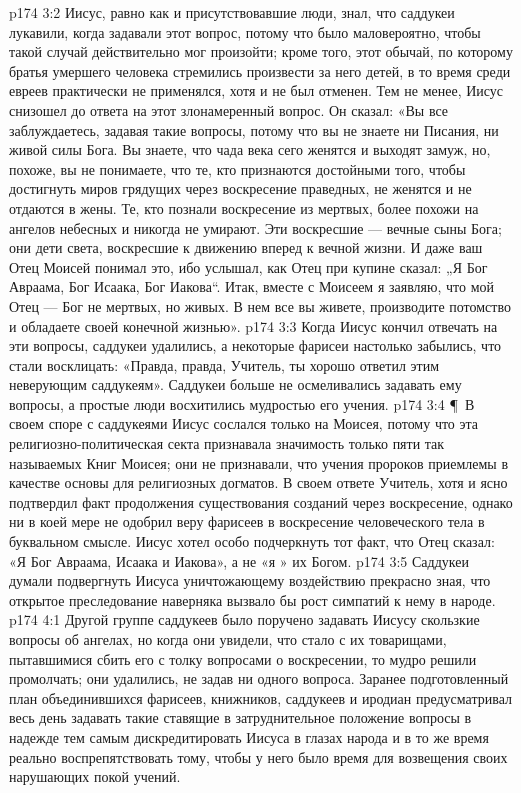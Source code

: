 \vs p174 3:2 Иисус, равно как и присутствовавшие люди, знал, что саддукеи лукавили, когда задавали этот вопрос, потому что было маловероятно, чтобы такой случай действительно мог произойти; кроме того, этот обычай, по которому братья умершего человека стремились произвести за него детей, в то время среди евреев практически не применялся, хотя и не был отменен. Тем не менее, Иисус снизошел до ответа на этот злонамеренный вопрос. Он сказал: «Вы все заблуждаетесь, задавая такие вопросы, потому что вы не знаете ни Писания, ни живой силы Бога. Вы знаете, что чада века сего женятся и выходят замуж, но, похоже, вы не понимаете, что те, кто признаются достойными того, чтобы достигнуть миров грядущих через воскресение праведных, не женятся и не отдаются в жены. Те, кто познали воскресение из мертвых, более похожи на ангелов небесных и никогда не умирают. Эти воскресшие --- вечные сыны Бога; они дети света, воскресшие к движению вперед к вечной жизни. И даже ваш Отец Моисей понимал это, ибо услышал, как Отец при купине сказал: „Я  Бог Авраама, Бог Исаака, Бог Иакова“. Итак, вместе с Моисеем я заявляю, что мой Отец --- Бог не мертвых, но живых. В нем все вы живете, производите потомство и обладаете своей конечной жизнью».
\vs p174 3:3 Когда Иисус кончил отвечать на эти вопросы, саддукеи удалились, а некоторые фарисеи настолько забылись, что стали восклицать: «Правда, правда, Учитель, ты хорошо ответил этим неверующим саддукеям». Саддукеи больше не осмеливались задавать ему вопросы, а простые люди восхитились мудростью его учения.
\vs p174 3:4 \P\ В своем споре с саддукеями Иисус сослался только на Моисея, потому что эта религиозно\hyp{}политическая секта признавала значимость только пяти так называемых Книг Моисея; они не признавали, что учения пророков приемлемы в качестве основы для религиозных догматов. В своем ответе Учитель, хотя и ясно подтвердил факт продолжения существования созданий через воскресение, однако ни в коей мере не одобрил веру фарисеев в воскресение человеческого тела в буквальном смысле. Иисус хотел особо подчеркнуть тот факт, что Отец сказал: «Я  Бог Авраама, Исаака и Иакова», а не «я  » их Богом.
\vs p174 3:5 Саддукеи думали подвергнуть Иисуса уничтожающему воздействию  прекрасно зная, что открытое преследование наверняка вызвало бы рост симпатий к нему в народе.
\vs p174 4:1 Другой группе саддукеев было поручено задавать Иисусу скользкие вопросы об ангелах, но когда они увидели, что стало с их товарищами, пытавшимися сбить его с толку вопросами о воскресении, то мудро решили промолчать; они удалились, не задав ни одного вопроса. Заранее подготовленный план объединившихся фарисеев, книжников, саддукеев и иродиан предусматривал весь день задавать такие ставящие в затруднительное положение вопросы в надежде тем самым дискредитировать Иисуса в глазах народа и в то же время реально воспрепятствовать тому, чтобы у него было время для возвещения своих нарушающих покой учений.
